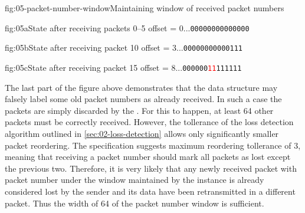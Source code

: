 \begin{myFigure}{fig:05-packet-number-window}{Maintaining window of received packet numbers}

  \begin{mySubfigure}{\textwidth}{fig:05a}{State after receiving packets 0--5}
    offset = 0\hspace{1cm}...\texttt{\textcolor{colorunimportant}{00000000000000}}
  \end{mySubfigure}

  \medskip

  \begin{mySubfigure}{\textwidth}{fig:05b}{State after receiving packet 10}
    offset = 3\hspace{1cm}...\texttt{\textcolor{colorunimportant}{00000000000}\textcolor{colorunimportant}{111}}
  \end{mySubfigure}

  \medskip

  \begin{mySubfigure}{\textwidth}{fig:05c}{State after receiving packet 15}
    offset = 8\hspace{1cm}...\texttt{\textcolor{colorunimportant}{000000}\textcolor{red}{11}\textcolor{colorunimportant}{111111}}
  \end{mySubfigure}

\end{myFigure}


The last part of the figure above demonstrates that the data structure may falsely label some old
packet numbers as already received. In such a case the packets are simply discarded by the
\ManagedQuicConnection{}. For this to happen, at least 64 other packets must be correctly received.
However, the tollerance of the loss detection algorithm outlined in \autoref{sec:02-loss-detection}
allows only significantly smaller packet reordering. The specification suggests maximum reordering
tollerance of 3, meaning that receiving a packet number should mark all packets as lost except the
previous two. Therefore, it is very likely that any newly received packet with packet number under
the window maintained by the \PacketNumberWindow{} instance is already considered lost by the sender
and its data have been retransmitted in a different packet. Thus the width of 64 of the packet
number window is sufficient.

